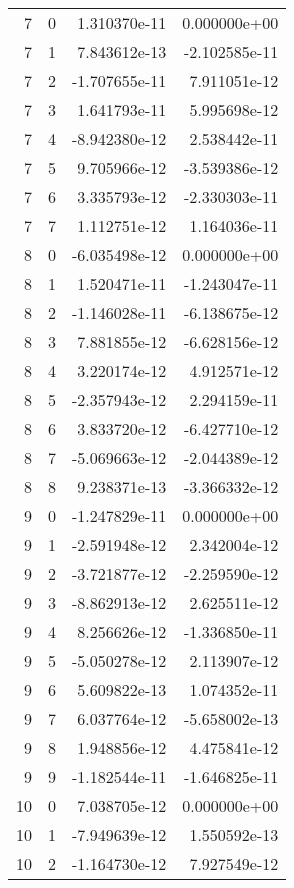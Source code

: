 \begin{tabular}{rrrr}
   7 &    0 &  1.310370e-11 &  0.000000e+00 \\
   7 &    1 &  7.843612e-13 & -2.102585e-11 \\
   7 &    2 & -1.707655e-11 &  7.911051e-12 \\
   7 &    3 &  1.641793e-11 &  5.995698e-12 \\
   7 &    4 & -8.942380e-12 &  2.538442e-11 \\
   7 &    5 &  9.705966e-12 & -3.539386e-12 \\
   7 &    6 &  3.335793e-12 & -2.330303e-11 \\
   7 &    7 &  1.112751e-12 &  1.164036e-11 \\
   8 &    0 & -6.035498e-12 &  0.000000e+00 \\
   8 &    1 &  1.520471e-11 & -1.243047e-11 \\
   8 &    2 & -1.146028e-11 & -6.138675e-12 \\
   8 &    3 &  7.881855e-12 & -6.628156e-12 \\
   8 &    4 &  3.220174e-12 &  4.912571e-12 \\
   8 &    5 & -2.357943e-12 &  2.294159e-11 \\
   8 &    6 &  3.833720e-12 & -6.427710e-12 \\
   8 &    7 & -5.069663e-12 & -2.044389e-12 \\
   8 &    8 &  9.238371e-13 & -3.366332e-12 \\
   9 &    0 & -1.247829e-11 &  0.000000e+00 \\
   9 &    1 & -2.591948e-12 &  2.342004e-12 \\
   9 &    2 & -3.721877e-12 & -2.259590e-12 \\
   9 &    3 & -8.862913e-12 &  2.625511e-12 \\
   9 &    4 &  8.256626e-12 & -1.336850e-11 \\
   9 &    5 & -5.050278e-12 &  2.113907e-12 \\
   9 &    6 &  5.609822e-13 &  1.074352e-11 \\
   9 &    7 &  6.037764e-12 & -5.658002e-13 \\
   9 &    8 &  1.948856e-12 &  4.475841e-12 \\
   9 &    9 & -1.182544e-11 & -1.646825e-11 \\
  10 &    0 &  7.038705e-12 &  0.000000e+00 \\
  10 &    1 & -7.949639e-12 &  1.550592e-13 \\
  10 &    2 & -1.164730e-12 &  7.927549e-12 \\

\end{tabular}

